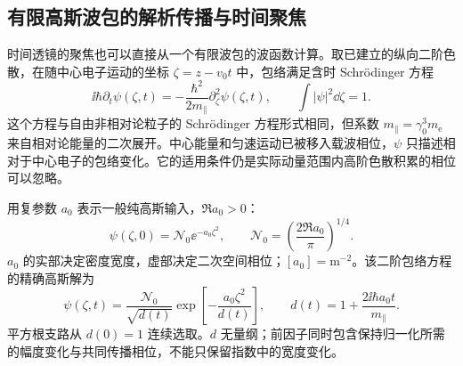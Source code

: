 \subsection{有限高斯波包的解析传播与时间聚焦}
\label{sec:electron-gaussian-lens-analytic}

时间透镜的聚焦也可以直接从一个有限波包的波函数计算。取已建立的纵向二阶色散，在随中心电子运动的坐标 $\zeta=z-v_0t$ 中，包络满足含时 Schrödinger 方程
\begin{equation}
 \ii\hbar\partial_t\psi(\zeta,t)
 =-\frac{\hbar^2}{2m_\parallel}\partial_\zeta^2\psi(\zeta,t),
 \qquad \int|\psi|^2\dd\zeta=1.
 \label{eq:electron-gaussian-envelope-tdse}
\end{equation}
这个方程与自由非相对论粒子的 Schrödinger 方程形式相同，但系数 $m_\parallel=\gamma_0^3m_{\mathrm e}$ 来自相对论能量的二次展开。中心能量和匀速运动已被移入载波相位，$\psi$ 只描述相对于中心电子的包络变化。它的适用条件仍是实际动量范围内高阶色散积累的相位可以忽略。

用复参数 $a_0$ 表示一般纯高斯输入，$\Re a_0>0$：
\begin{equation*}
 \psi(\zeta,0)=\mathcal N_0\ee^{-a_0\zeta^2},\qquad
 \mathcal N_0=\left(\frac{2\Re a_0}{\pi}\right)^{1/4}.
\end{equation*}
$a_0$ 的实部决定密度宽度，虚部决定二次空间相位；$[a_0]=\mathrm{m^{-2}}$。该二阶包络方程的精确高斯解为
\begin{equation}
 \psi(\zeta,t)=\frac{\mathcal N_0}{\sqrt{d(t)}}
 \exp\!\left[-\frac{a_0\zeta^2}{d(t)}\right],\qquad
 d(t)=1+\frac{2\ii\hbar a_0t}{m_\parallel}.
 \label{eq:electron-gaussian-tdse-solution}
\end{equation}
平方根支路从 $d(0)=1$ 连续选取。$d$ 无量纲；前因子同时包含保持归一化所需的幅度变化与共同传播相位，不能只保留指数中的宽度变化。

